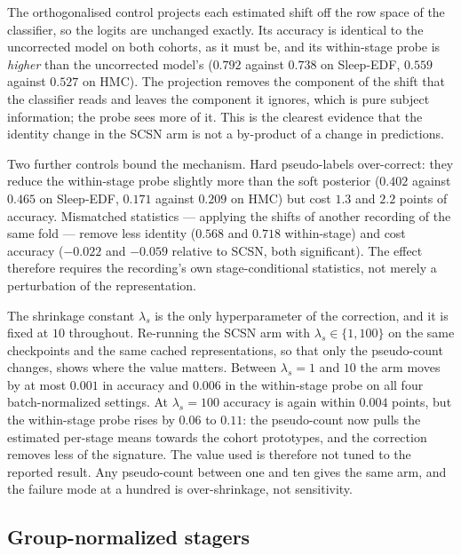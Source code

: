 The orthogonalised control projects each estimated shift off the row space of
the classifier, so the logits are unchanged exactly. Its accuracy is
identical to the uncorrected model on both cohorts, as it must be, and its
within-stage probe is \emph{higher} than the uncorrected model's
($0.792$ against $0.738$ on Sleep-EDF, $0.559$ against $0.527$ on HMC). The
projection removes the component of the shift that the classifier reads and
leaves the component it ignores, which is pure subject information; the
probe sees more of it. This is the clearest evidence that the identity change
in the SCSN arm is not a by-product of a change in predictions.

Two further controls bound the mechanism. Hard pseudo-labels over-correct:
they reduce the within-stage probe slightly more than the soft posterior
($0.402$ against $0.465$ on Sleep-EDF, $0.171$ against $0.209$ on HMC) but
cost $1.3$ and $2.2$ points of accuracy. Mismatched statistics --- applying
the shifts of another recording of the same fold --- remove less identity
($0.568$ and $0.718$ within-stage) and cost accuracy ($-0.022$ and $-0.059$
relative to SCSN, both significant). The effect therefore requires the
recording's own stage-conditional statistics, not merely a perturbation of the
representation.

The shrinkage constant $\lambda_s$ is the only hyperparameter of the
correction, and it is fixed at $10$ throughout. Re-running the SCSN arm with
$\lambda_s\in\{1,100\}$ on the same checkpoints and the same cached
representations, so that only the pseudo-count changes, shows where the value
matters. Between $\lambda_s=1$ and $10$ the arm moves by at most $0.001$ in
accuracy and $0.006$ in the within-stage probe on all four batch-normalized
settings. At $\lambda_s=100$ accuracy is again within $0.004$ points, but the
within-stage probe rises by $0.06$ to $0.11$: the pseudo-count now pulls the
estimated per-stage means towards the cohort prototypes, and the correction
removes less of the signature. The value used is therefore not tuned to the
reported result. Any pseudo-count between one and ten gives the same arm, and
the failure mode at a hundred is over-shrinkage, not sensitivity.

\subsection{Group-normalized stagers}
\label{sec:gn}


